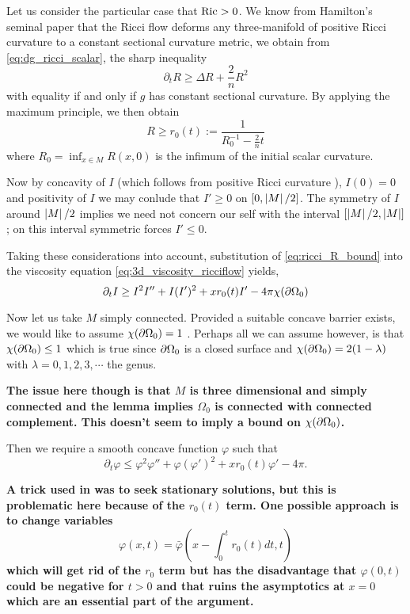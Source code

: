 \documentclass{amsart}
\begin{document}
Let us consider the particular case that \(\operatorname{Ric} > 0\). We know from Hamilton's seminal paper \cite{Hamilton:/1982} that the Ricci flow deforms any three-manifold of positive Ricci curvature to a constant sectional curvature metric, we obtain from \eqref{eq:dg_ricci_scalar}, the sharp inequality
\[
\partial_t R \geq \Delta R + \frac{2}{n} R^2
\]
with equality if and only if \(g\) has constant sectional curvature. By applying the maximum principle, we then obtain
\begin{equation}
\label{eq:ricci_R_bound}
R \geq r_0(t) := \frac{1}{R_0^{-1} - \tfrac{2}{n} t}
\end{equation}
where \(R_0 = \inf_{x\in M} R(x, 0)\) is the infimum of the initial scalar curvature.

Now by concavity of \(I\) (which follows from positive Ricci curvature \cite{MR875084}), \(I(0) = 0\) and positivity of \(I\) we may conlude that \(I' \geq 0\) on \([0, \left|{M}\right|/2]\). The symmetry of \(I\) around \(\left|{M}\right|/2\) implies we need not concern our self with the interval \([\left|{M}\right|/2, \left|{M}\right|]\); on this interval symmetric forces \(I'\leq 0\).

Taking these considerations into account, substitution of \eqref{eq:ricci_R_bound} into the viscosity equation \eqref{eq:3d_viscosity_ricciflow} yields,
\begin{equation}
\label{eq:ricci_threed_iso_ineq}
\partial_t I \geq I^2I'' + I(I')^2 + x r_0(t) I' - 4\pi\chi(\partial {\Omega_0})
\end{equation}

Now let us take \(M\) simply connected. Provided a suitable concave barrier exists, we would like to assume \(\chi(\partial {\Omega_0}) = 1\) \cite[Lemma 2.9 and Corollaries]{Bryan:/2016}. Perhaps all we can assume however, is that \(\chi(\partial {\Omega_0}) \leq 1\) which is true since \(\partial {\Omega_0}\) is a closed surface and \(\chi(\partial {\Omega_0}) = 2(1-\lambda)\) with \(\lambda = 0, 1, 2, 3, \cdots\) the genus.

\textbf{The issue here though is that \(M\) is three dimensional and simply connected and the lemma implies \(\Omega_0\) is connected with connected complement. This doesn't seem to imply a bound on \(\chi(\partial {\Omega_0})\).}

Then we require a smooth concave function \(\varphi\) such that
\[
\partial_t \varphi \leq \varphi^2\varphi'' + \varphi(\varphi')^2 + x r_0(t) \varphi' - 4\pi.
\]

\textbf{A trick used in \cite{Bryan:/2016} was to seek stationary solutions, but this is problematic here because of the \(r_0(t)\) term. One possible approach is to change variables
\[
\varphi(x, t) = \bar{\varphi}(x - \int_0^t r_0(t) dt, t)
\]
which will get rid of the \(r_0\) term but has the disadvantage that \(\varphi(0, t)\) could be negative for \(t > 0\) and that ruins the asymptotics at \(x = 0\) which are an essential part of the argument.}
\end{document}
